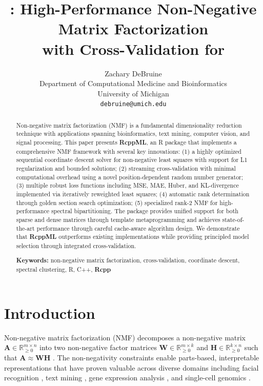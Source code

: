 \documentclass[11pt]{article}
\title{\pkg{RcppML}: High-Performance Non-Negative Matrix Factorization\\
with Cross-Validation for \proglang{R}}
\author{Zachary DeBruine\\
Department of Computational Medicine and Bioinformatics\\
University of Michigan\\
\texttt{debruine@umich.edu}}
\date{}
\newcommand{\proglang}[1]{\textsf{#1}}
\newcommand{\pkg}[1]{\textbf{#1}}
\begin{document}
\maketitle

\begin{abstract}
Non-negative matrix factorization (NMF) is a fundamental dimensionality 
reduction technique with applications spanning bioinformatics, text mining, 
computer vision, and signal processing. This paper presents \pkg{RcppML}, an 
\proglang{R} package that implements a comprehensive NMF framework with several 
key innovations: (1) a highly optimized sequential coordinate descent solver for 
non-negative least squares with support for L1 regularization and bounded 
solutions; (2) streaming cross-validation with minimal computational overhead 
using a novel position-dependent random number generator; (3) multiple robust 
loss functions including MSE, MAE, Huber, and KL-divergence implemented via 
iteratively reweighted least squares; (4) automatic rank determination through 
golden section search optimization; (5) specialized rank-2 NMF for 
high-performance spectral bipartitioning. The package provides unified support 
for both sparse and dense matrices through template metaprogramming and achieves 
state-of-the-art performance through careful cache-aware algorithm design. We 
demonstrate that \pkg{RcppML} outperforms existing implementations while 
providing principled model selection through integrated cross-validation.

\vspace{1em}
\noindent\textbf{Keywords:} non-negative matrix factorization, cross-validation, coordinate 
descent, spectral clustering, \proglang{R}, \proglang{C++}, \pkg{Rcpp}
\end{abstract}


\section{Introduction} \label{sec:introduction}

Non-negative matrix factorization (NMF) decomposes a non-negative matrix 
$\mathbf{A} \in \mathbb{R}_{\geq 0}^{m \times n}$ into two non-negative factor 
matrices $\mathbf{W} \in \mathbb{R}_{\geq 0}^{m \times k}$ and 
$\mathbf{H} \in \mathbb{R}_{\geq 0}^{k \times n}$ such that 
$\mathbf{A} \approx \mathbf{W}\mathbf{H}$ \citep{Lee1999}. The non-negativity 
constraints enable parts-based, interpretable representations that have proven 
valuable across diverse domains including facial recognition \citep{Lee1999}, 
text mining \citep{Xu2003}, gene expression analysis \citep{Brunet2004}, and 
single-cell genomics \citep{Kotliar2019}.
\end{document}
